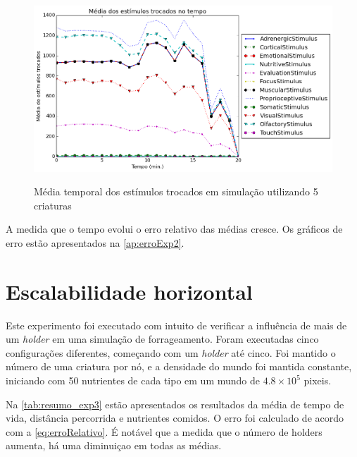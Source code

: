 \begin{figure}[H]
  \centering
  \caption{Média temporal dos estímulos trocados em simulação utilizando 5 criaturas}
  \includegraphics[scale=0.6]{04-figuras/experiments/exp_2/5/avgExchangedStimuliOverTime.png}
  \label{fig:exp_2_5_exchgStimuli}
\end{figure}

A medida que o tempo evolui o erro relativo das médias cresce. Os gráficos de erro estão apresentados na \autoref{ap:erroExp2}.

\section{Escalabilidade horizontal}
\label{sec:esc_horizontal}

Este experimento foi executado com intuito de verificar a influência de mais de um \textit{holder} em uma simulação de forrageamento. Foram executadas cinco configurações diferentes, começando com um \textit{holder} até cinco. Foi mantido o número de uma criatura por nó, e a densidade do mundo foi mantida constante, iniciando com 50 nutrientes de cada tipo em um mundo de $4.8 \times 10^{5}$ pixeis.

Na \autoref{tab:resumo_exp3} estão apresentados os resultados da média de tempo de vida, distância percorrida e nutrientes comidos. O erro foi calculado de acordo com a \autoref{eq:erroRelativo}. É notável que a medida que o número de holders aumenta, há uma diminuiçao em todas as médias. 

